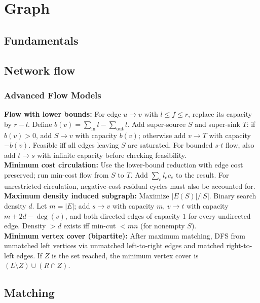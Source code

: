 \chapter{Graph}

\section{Fundamentals}

\section{Network flow}
	\subsection{Advanced Flow Models}
		\textbf{Flow with lower bounds:} For edge $u\to v$ with $l\le f\le r$, replace its capacity by $r-l$. Define $b(v)=\sum_{\mathrm{in}}l-\sum_{\mathrm{out}}l$. Add super-source $S$ and super-sink $T$: if $b(v)>0$, add $S\to v$ with capacity $b(v)$; otherwise add $v\to T$ with capacity $-b(v)$. Feasible iff all edges leaving $S$ are saturated. For bounded $s$-$t$ flow, also add $t\to s$ with infinite capacity before checking feasibility.\\
		\textbf{Minimum cost circulation:} Use the lower-bound reduction with edge cost preserved; run min-cost flow from $S$ to $T$. Add $\sum_e l_ec_e$ to the result. For unrestricted circulation, negative-cost residual cycles must also be accounted for.\\
		\textbf{Maximum density induced subgraph:} Maximize $|E(S)|/|S|$. Binary search density $d$. Let $m=|E|$; add $s\to v$ with capacity $m$, $v\to t$ with capacity $m+2d-\deg(v)$, and both directed edges of capacity $1$ for every undirected edge. Density $>d$ exists iff min-cut $<mn$ (for nonempty $S$).\\
		\textbf{Minimum vertex cover (bipartite):} After maximum matching, DFS from unmatched left vertices via unmatched left-to-right edges and matched right-to-left edges. If $Z$ is the set reached, the minimum vertex cover is $(L\setminus Z)\cup(R\cap Z)$.


\section{Matching}
